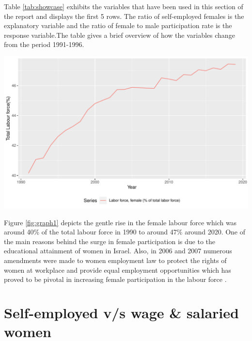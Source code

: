 \documentclass[11pt,a4paper,]{article}
\let\origfigure\figure
\let\endorigfigure\endfigure
\renewenvironment{figure}[1][2] {
    \expandafter\origfigure\expandafter[H]
} {
    \endorigfigure
}%
\begin{document}
Table \ref{tab:showcase} exhibits the variables that have been used in this section of the report and displays the first 5 rows. The ratio of self-employed females is the explanatory variable and the ratio of female to male participation rate is the response variable.The table gives a brief overview of how the variables change from the period 1991-1996.

\begin{figure}
\centering
\includegraphics{report_files/figure-latex/graph1-1.pdf}
\caption{\label{fig:graph1}\% Female labour force out of total labour force}
\end{figure}

Figure \ref{fig:graph1} depicts the gentle rise in the female labour force which was around 40\% of the total labour force in 1990 to around 47\% around 2020. One of the main reasons behind the surge in female participation is due to the educational attainment of women in Israel. Also, in 2006 and 2007 numerous amendments were made to women employment law to protect the rights of women at workplace and provide equal employment opportunities which has proved to be pivotal in increasing female participation in the labour force \autocite{israelministryofforeignaffairs2013}.

\hypertarget{self-employed-vs-wage-salaried-women}{%
\section{Self-employed v/s wage \& salaried women}\label{self-employed-vs-wage-salaried-women}}
\end{document}
